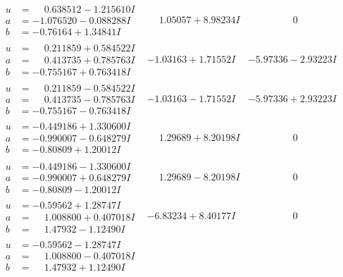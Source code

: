 \documentclass[1p]{elsarticle_modified}
\theoremstyle{definition}
\begin{document}
$$\begin{array}{c|c|c}
 \hline 
\begin{aligned}
u &= \phantom{-}0.638512 - 1.215610 I \\
a &= -1.076520 - 0.088288 I \\
b &= -0.76164 + 1.34841 I\end{aligned}
 & \phantom{-}1.05057 + 8.98234 I & \phantom{-0.000000 } 0 \\ \hline\begin{aligned}
u &= \phantom{-}0.211859 + 0.584522 I \\
a &= \phantom{-}0.413735 + 0.785763 I \\
b &= -0.755167 + 0.763418 I\end{aligned}
 & -1.03163 + 1.71552 I & -5.97336 - 2.93223 I \\ \hline\begin{aligned}
u &= \phantom{-}0.211859 - 0.584522 I \\
a &= \phantom{-}0.413735 - 0.785763 I \\
b &= -0.755167 - 0.763418 I\end{aligned}
 & -1.03163 - 1.71552 I & -5.97336 + 2.93223 I \\ \hline\begin{aligned}
u &= -0.449186 + 1.330600 I \\
a &= -0.990007 - 0.648279 I \\
b &= -0.80809 + 1.20012 I\end{aligned}
 & \phantom{-}1.29689 + 8.20198 I & \phantom{-0.000000 } 0 \\ \hline\begin{aligned}
u &= -0.449186 - 1.330600 I \\
a &= -0.990007 + 0.648279 I \\
b &= -0.80809 - 1.20012 I\end{aligned}
 & \phantom{-}1.29689 - 8.20198 I & \phantom{-0.000000 } 0 \\ \hline\begin{aligned}
u &= -0.59562 + 1.28747 I \\
a &= \phantom{-}1.008800 + 0.407018 I \\
b &= \phantom{-}1.47932 - 1.12490 I\end{aligned}
 & -6.83234 + 8.40177 I & \phantom{-0.000000 } 0 \\ \hline\begin{aligned}
u &= -0.59562 - 1.28747 I \\
a &= \phantom{-}1.008800 - 0.407018 I \\
b &= \phantom{-}1.47932 + 1.12490 I\end{aligned}

\end{array}$$
\end{document}
